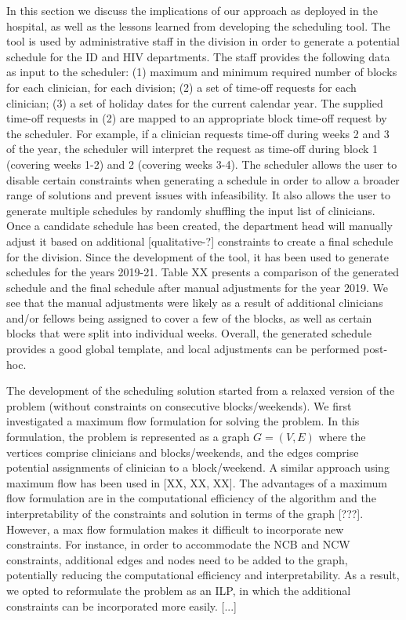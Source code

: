 In this section we discuss the implications of our approach as deployed in the hospital,
as well as the lessons learned from developing the scheduling tool.
The tool is used by administrative staff in the division in order to generate a potential schedule
for the ID and HIV departments. 
The staff provides the following data as input to the scheduler:
(1) maximum and minimum required number of blocks for each clinician, for each division;
(2) a set of time-off requests for each clinician;
(3) a set of holiday dates for the current calendar year.
The supplied time-off requests in (2) are mapped to an appropriate block time-off request by the scheduler.
For example, if a clinician requests time-off during weeks 2 and 3 of the year, the scheduler
will interpret the request as time-off during block 1 (covering weeks 1-2) and 2 (covering weeks 3-4).
The scheduler allows the user to disable certain constraints when generating a schedule
in order to allow a broader range of solutions and prevent issues with infeasibility. 
It also allows the user to generate multiple schedules by randomly shuffling the input list of clinicians.
Once a candidate schedule has been created, the department head will manually adjust it based on
additional [qualitative-?] constraints to create a final schedule for the division.
Since the development of the tool, it has been used to generate schedules for the years 2019-21.
Table XX presents a comparison of the generated schedule and the final schedule after manual adjustments
for the year 2019. We see that the manual adjustments were likely as a result of additional clinicians
and/or fellows being assigned to cover a few of the blocks, as well as certain blocks that were 
split into individual weeks. Overall, the generated schedule provides a good global template,
and local adjustments can be performed post-hoc.

The development of the scheduling solution started from a relaxed version of the problem
(without constraints on consecutive blocks/weekends).
We first investigated a maximum flow formulation for solving the problem.
In this formulation, the problem is represented as a graph $G=(V, E)$ where
the vertices comprise clinicians and blocks/weekends, and the edges comprise
potential assignments of clinician to a block/weekend.
A similar approach using maximum flow has been used in [XX, XX, XX].
The advantages of a maximum flow formulation are in the computational efficiency
of the algorithm and the interpretability of the constraints and solution in terms of the graph [???].
However, a max flow formulation makes it difficult to incorporate new constraints.
For instance, in order to accommodate the NCB and NCW constraints,
additional edges and nodes need to be added to the graph, potentially reducing 
the computational efficiency and interpretability.
As a result, we opted to reformulate the problem as an ILP, in which the additional constraints
can be incorporated more easily.
[...]